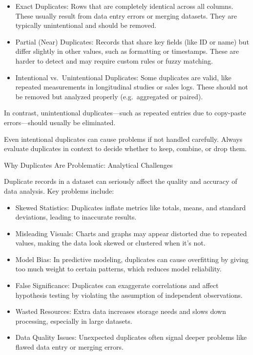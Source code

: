 \documentclass[
  man,
  floatsintext,
  longtable,
  nolmodern,
  notxfonts,
  notimes,
  colorlinks=true,linkcolor=blue,citecolor=blue,urlcolor=blue]{apa7}
\begin{document}
\begin{itemize}
\item
  Exact Duplicates: Rows that are completely identical across all
  columns. These usually result from data entry errors or merging
  datasets. They are typically unintentional and should be removed.
\item
  Partial (Near) Duplicates: Records that share key fields (like ID or
  name) but differ slightly in other values, such as formatting or
  timestamps. These are harder to detect and may require custom rules or
  fuzzy matching.
\item
  Intentional vs.~Unintentional Duplicates: Some duplicates are valid,
  like repeated measurements in longitudinal studies or sales logs.
  These should not be removed but analyzed properly (e.g.~aggregated or
  paired).
\end{itemize}

In contrast, unintentional duplicates---such as repeated entries due to
copy-paste errors---should usually be eliminated.

Even intentional duplicates can cause problems if not handled carefully.
Always evaluate duplicates in context to decide whether to keep,
combine, or drop them.

Why Duplicates Are Problematic: Analytical Challenges

Duplicate records in a dataset can seriously affect the quality and
accuracy of data analysis. Key problems include:

\begin{itemize}
\item
  Skewed Statistics: Duplicates inflate metrics like totals, means, and
  standard deviations, leading to inaccurate results.
\item
  Misleading Visuals: Charts and graphs may appear distorted due to
  repeated values, making the data look skewed or clustered when it's
  not.
\item
  Model Bias: In predictive modeling, duplicates can cause overfitting
  by giving too much weight to certain patterns, which reduces model
  reliability.
\item
  False Significance: Duplicates can exaggerate correlations and affect
  hypothesis testing by violating the assumption of independent
  observations.
\item
  Wasted Resources: Extra data increases storage needs and slows down
  processing, especially in large datasets.
\item
  Data Quality Issues: Unexpected duplicates often signal deeper
  problems like flawed data entry or merging errors.
\end{itemize}
\end{document}
